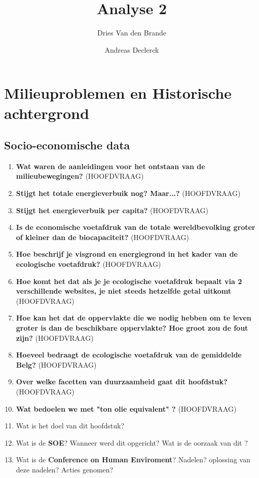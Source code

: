 \documentclass[12pt]{article}
\begin{document}
    \title{Analyse 2}
    \author{Dries Van den Brande \and Andreas Declerck}

    \maketitle

    \section{Milieuproblemen en Historische achtergrond}
    \subsection{Socio-economische data}
    \begin{enumerate}
        \item \textbf{Wat waren de aanleidingen voor het ontstaan van de milieubewegingen?} (HOOFDVRAAG)
        \item \textbf{Stijgt het totale energieverbuik nog? Maar...?} (HOOFDVRAAG)
        \item \textbf{Stijgt het energieverbuik per capita?} (HOOFDVRAAG)
        \item \textbf{Is de economische voetafdruk van de totale wereldbevolking groter of kleiner dan de biocapaciteit?} (HOOFDVRAAG)
        \item \textbf{Hoe beschrijf je visgrond en energiegrond in het kader van de ecologische voetafdruk?} (HOOFDVRAAG)
        \item \textbf{Hoe komt het dat als je je ecologische voetafdruk bepaalt via 2 verschillende websites, je niet steeds hetzelfde getal uitkomt} (HOOFDVRAAG)
        \item \textbf{Hoe kan het dat de oppervlakte die we nodig hebben om te leven groter is dan de beschikbare oppervlakte? Hoe groot zou de fout zijn?} (HOOFDVRAAG)
        \item \textbf{Hoeveel bedraagt de ecologische voetafdruk van de gemiddelde Belg?} (HOOFDVRAAG)
        \item \textbf{Over welke facetten van duurzaamheid gaat dit hoofdstuk?} (HOOFDVRAAG)
        \item \textbf{Wat bedoelen we met "ton olie equivalent" ?} (HOOFDVRAAG)
        \item Wat is het doel van dit hoofdstuk?
        \item Wat is de \textbf{SOE}? Wanneer werd dit opgericht? Wat is de oorzaak van dit ?
        \item Wat is de \textbf{Conference on Human Enviroment}? Nadelen? oplossing van deze nadelen? Acties genomen?

\end{enumerate}
\end{document}

